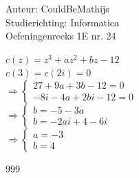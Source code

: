 \documentclass[a4paper]{article}
\begin{document}
  
\noindent \large Auteur: CouldBeMathijs \\
\noindent \large Studierichting: Informatica\\
\noindent \large Oefeningenreeks 1E nr. 24\\

\medskip

\normalsize

$c(z) =  z^3 + az^2 + bz - 12$\\

$c(3) = c(2i) = 0$\\

$\Rightarrow\left\{
	\begin{array}{l}
		27+9 a+3 b-12=0 \\
		-8 i-4 a+2 b i-12=0
	\end{array}
\right .$\\

$\Rightarrow\left\{
	\begin{array}{l}
		b=-5-3 a \\
		b=-2 a i+4-6 i
	\end{array}
\right .$\\
    
    

$\Rightarrow\left\{
	\begin{array}{l}
		a=-3 \\
		b=4
	\end{array}
\right .$\\



\begin{thebibliography}{999}
\end{thebibliography}
\end{document}
